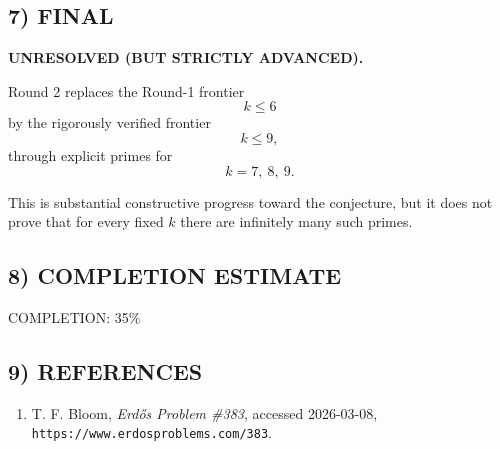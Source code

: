 \subsection*{7) FINAL}

\textbf{UNRESOLVED (BUT STRICTLY ADVANCED).}

Round 2 replaces the Round-1 frontier
\[
k\le 6
\]
by the rigorously verified frontier
\[
k\le 9,
\]
through explicit primes for
\[
k=7,\ 8,\ 9.
\]

This is substantial constructive progress toward the conjecture, but it does not prove that for every fixed $k$ there are infinitely many such primes.

\subsection*{8) COMPLETION ESTIMATE}

COMPLETION: 35\%

\subsection*{9) REFERENCES}

\begin{enumerate}
\item T. F. Bloom, \emph{Erd\H{o}s Problem \#383}, accessed 2026-03-08, \texttt{https://www.erdosproblems.com/383}.
\end{enumerate}

